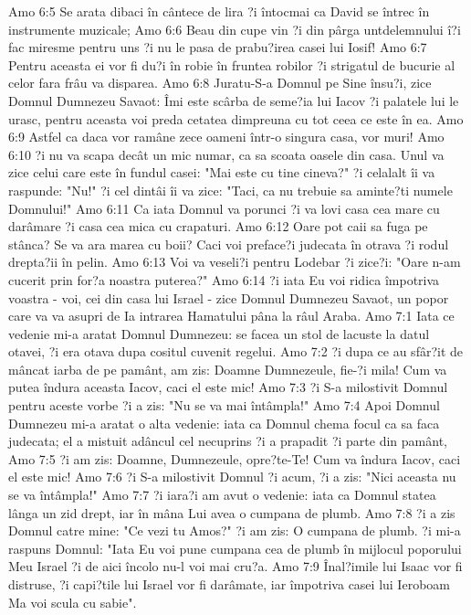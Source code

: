 Amo 6:5  Se arata dibaci în cântece de lira ?i întocmai ca David se întrec în instrumente muzicale;
Amo 6:6  Beau din cupe vin ?i din pârga untdelemnului î?i fac miresme pentru uns ?i nu le pasa de prabu?irea casei lui Iosif!
Amo 6:7  Pentru aceasta ei vor fi du?i în robie în fruntea robilor ?i strigatul de bucurie al celor fara frâu va disparea.
Amo 6:8  Juratu-S-a Domnul pe Sine însu?i, zice Domnul Dumnezeu Savaot: Îmi este scârba de seme?ia lui Iacov ?i palatele lui le urasc, pentru aceasta voi preda cetatea dimpreuna cu tot ceea ce este în ea.
Amo 6:9  Astfel ca daca vor ramâne zece oameni într-o singura casa, vor muri!
Amo 6:10  ?i nu va scapa decât un mic numar, ca sa scoata oasele din casa. Unul va zice celui care este în fundul casei: "Mai este cu tine cineva?" ?i celalalt îi va raspunde: "Nu!" ?i cel dintâi îi va zice: "Taci, ca nu trebuie sa aminte?ti numele Domnului!"
Amo 6:11  Ca iata Domnul va porunci ?i va lovi casa cea mare cu darâmare ?i casa cea mica cu crapaturi.
Amo 6:12  Oare pot caii sa fuga pe stânca? Se va ara marea cu boii? Caci voi preface?i judecata în otrava ?i rodul drepta?ii în pelin.
Amo 6:13  Voi va veseli?i pentru Lodebar ?i zice?i: "Oare n-am cucerit prin for?a noastra puterea?"
Amo 6:14  ?i iata Eu voi ridica împotriva voastra - voi, cei din casa lui Israel - zice Domnul Dumnezeu Savaot, un popor care va va asupri de Ia intrarea Hamatului pâna la râul Araba.
Amo 7:1  Iata ce vedenie mi-a aratat Domnul Dumnezeu: se facea un stol de lacuste la datul otavei, ?i era otava dupa cositul cuvenit regelui.
Amo 7:2  ?i dupa ce au sfâr?it de mâncat iarba de pe pamânt, am zis: Doamne Dumnezeule, fie-?i mila! Cum va putea îndura aceasta Iacov, caci el este mic!
Amo 7:3  ?i S-a milostivit Domnul pentru aceste vorbe ?i a zis: "Nu se va mai întâmpla!"
Amo 7:4  Apoi Domnul Dumnezeu mi-a aratat o alta vedenie: iata ca Domnul chema focul ca sa faca judecata; el a mistuit adâncul cel necuprins ?i a prapadit ?i parte din pamânt,
Amo 7:5  ?i am zis: Doamne, Dumnezeule, opre?te-Te! Cum va îndura Iacov, caci el este mic!
Amo 7:6  ?i S-a milostivit Domnul ?i acum, ?i a zis: "Nici aceasta nu se va întâmpla!"
Amo 7:7  ?i iara?i am avut o vedenie: iata ca Domnul statea lânga un zid drept, iar în mâna Lui avea o cumpana de plumb.
Amo 7:8  ?i a zis Domnul catre mine: "Ce vezi tu Amos?" ?i am zis: O cumpana de plumb. ?i mi-a raspuns Domnul: "Iata Eu voi pune cumpana cea de plumb în mijlocul poporului Meu Israel ?i de aici încolo nu-l voi mai cru?a.
Amo 7:9  Înal?imile lui Isaac vor fi distruse, ?i capi?tile lui Israel vor fi darâmate, iar împotriva casei lui Ieroboam Ma voi scula cu sabie".
